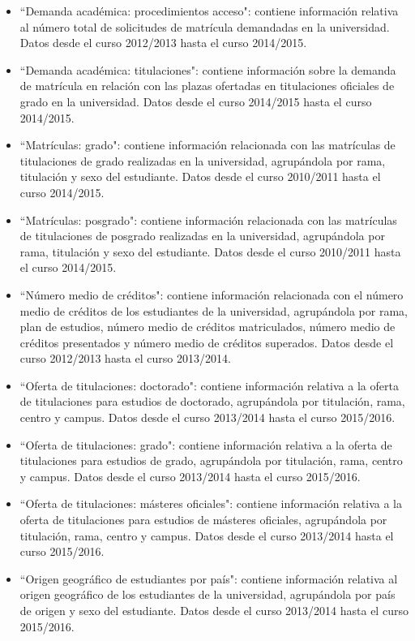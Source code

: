 \begin{itemize}
	\item ``Demanda académica: procedimientos acceso": contiene información relativa al número total de solicitudes de matrícula demandadas en la universidad. Datos desde el curso 2012/2013 hasta el curso 2014/2015.
	\item ``Demanda académica: titulaciones": contiene información sobre la demanda de matrícula en relación con las plazas ofertadas en titulaciones oficiales de grado en la universidad. Datos desde el curso 2014/2015 hasta el curso 2014/2015.
	\item ``Matrículas: grado": contiene información relacionada con las matrículas de titulaciones de grado realizadas en la universidad, agrupándola por rama, titulación y sexo del estudiante. Datos desde el curso 2010/2011 hasta el curso 2014/2015.
	\item ``Matrículas: posgrado": contiene información relacionada con las matrículas de titulaciones de posgrado realizadas en la universidad, agrupándola por rama, titulación y sexo del estudiante. Datos desde el curso 2010/2011 hasta el curso 2014/2015.
	\item ``Número medio de créditos": contiene información relacionada con el número medio de créditos de los estudiantes de la universidad, agrupándola por rama, plan de estudios, número medio de créditos matriculados, número medio de créditos presentados y número medio de créditos superados. Datos desde el curso 2012/2013 hasta el curso 2013/2014.
	\item ``Oferta de titulaciones: doctorado": contiene información relativa a la oferta de titulaciones para estudios de doctorado, agrupándola por titulación, rama, centro y campus. Datos desde el curso 2013/2014 hasta el curso 2015/2016.
	\item ``Oferta de titulaciones: grado": contiene información relativa a la oferta de titulaciones para estudios de grado, agrupándola por titulación, rama, centro y campus. Datos desde el curso 2013/2014 hasta el curso 2015/2016.
	\item ``Oferta de titulaciones: másteres oficiales": contiene información relativa a la oferta de titulaciones para estudios de másteres oficiales, agrupándola por titulación, rama, centro y campus. Datos desde el curso 2013/2014 hasta el curso 2015/2016.
	\item ``Origen geográfico de estudiantes por país": contiene información relativa al origen geográfico de los estudiantes de la universidad, agrupándola por país de origen y sexo del estudiante. Datos desde el curso 2013/2014 hasta el curso 2015/2016.

\end{itemize}
